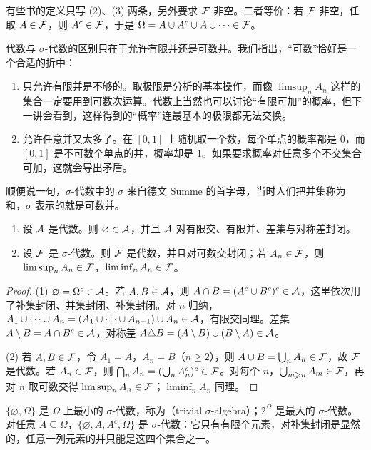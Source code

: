有些书的定义只写 (2)、(3) 两条，另外要求 $\mathcal{F}$ 非空。二者等价：若 $\mathcal{F}$ 非空，任取 $A\in\mathcal{F}$，则 $A^c\in\mathcal{F}$，于是 $\Omega=A\cup A^c\cup A\cup\cdots\in\mathcal{F}$。

\begin{remark}[为什么是“可数”]
代数与 $\sigma$-代数的区别只在于允许有限并还是可数并。我们指出，“可数”恰好是一个合适的折中：
\begin{enumerate}
\item 只允许有限并是不够的。取极限是分析的基本操作，而像 $\limsup_nA_n$ 这样的集合一定要用到可数次运算。代数上当然也可以讨论“有限可加”的概率，但下一讲会看到，这样得到的“概率”连最基本的极限都无法交换。
\item 允许任意并又太多了。在 $[0,1]$ 上随机取一个数，每个单点的概率都是 $0$，而 $[0,1]$ 是不可数个单点的并，概率却是 $1$。如果要求概率对任意多个不交集合可加，这就会导出矛盾。
\end{enumerate}
顺便说一句，$\sigma$-代数中的 $\sigma$ 来自德文 Summe 的首字母，当时人们把并集称为和，$\sigma$ 表示的就是可数并。
\end{remark}

\begin{proposition}\label{prop:set-systems:closure}
\begin{enumerate}
\item 设 $\mathcal{A}$ 是代数。则 $\varnothing\in\mathcal{A}$，并且 $\mathcal{A}$ 对有限交、有限并、差集与对称差封闭。
\item 设 $\mathcal{F}$ 是 $\sigma$-代数。则 $\mathcal{F}$ 是代数，并且对可数交封闭；若 $A_n\in\mathcal{F}$，则 $\limsup_nA_n\in\mathcal{F}$，$\liminf_nA_n\in\mathcal{F}$。
\end{enumerate}
\end{proposition}
\begin{proof}
(1) $\varnothing=\Omega^c\in\mathcal{A}$。若 $A,B\in\mathcal{A}$，则 $A\cap B=(A^c\cup B^c)^c\in\mathcal{A}$，这里依次用了补集封闭、并集封闭、补集封闭。对 $n$ 归纳，$A_1\cup\cdots\cup A_n=(A_1\cup\cdots\cup A_{n-1})\cup A_n\in\mathcal{A}$，有限交同理。差集 $A\setminus B=A\cap B^c\in\mathcal{A}$，对称差 $A\triangle B=(A\setminus B)\cup(B\setminus A)\in\mathcal{A}$。

(2) 若 $A,B\in\mathcal{F}$，令 $A_1=A$，$A_n=B$（$n\geqslant2$），则 $A\cup B=\bigcup_nA_n\in\mathcal{F}$，故 $\mathcal{F}$ 是代数。若 $A_n\in\mathcal{F}$，则 $\bigcap_nA_n=(\bigcup_nA_n^c)^c\in\mathcal{F}$。对每个 $n$，$\bigcup_{m\geqslant n}A_m\in\mathcal{F}$，再对 $n$ 取可数交得 $\limsup_nA_n\in\mathcal{F}$；$\liminf_nA_n$ 同理。
\end{proof}

\begin{example}
$\{\varnothing,\Omega\}$ 是 $\Omega$ 上最小的 $\sigma$-代数，称为（trivial $\sigma$-algebra）；$2^\Omega$ 是最大的 $\sigma$-代数。对任意 $A\subseteq\Omega$，$\{\varnothing,A,A^c,\Omega\}$ 是 $\sigma$-代数：它只有有限个元素，对补集封闭是显然的，任意一列元素的并只能是这四个集合之一。
\end{example}

